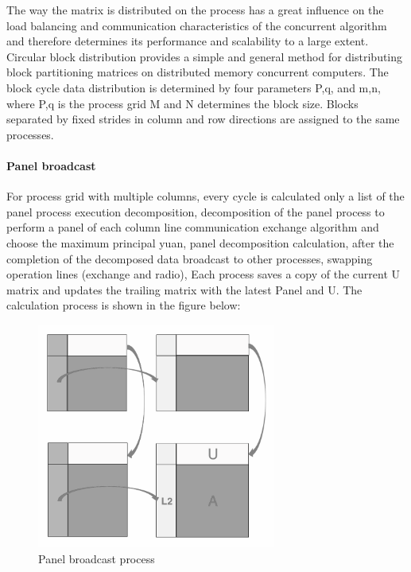 \documentclass[a4paper,12pt]{article}
\begin{document}
The way the matrix is distributed on the process has a great influence on the load balancing and communication characteristics of the concurrent algorithm and therefore determines its performance and scalability to a large extent. Circular block distribution provides a simple and general method for distributing block partitioning matrices on distributed memory concurrent computers. The block cycle data distribution is determined by four parameters P,q, and m,n, where P,q is the process grid M and N determines the block size. Blocks separated by fixed strides in column and row directions are assigned to the same processes.

\paragraph{Panel broadcast}

For process grid with multiple columns, every cycle is calculated only a list of the panel process execution decomposition, decomposition of the panel process to perform a panel of each column line communication exchange algorithm and choose the maximum principal yuan, panel decomposition calculation, after the completion of the decomposed data broadcast to other processes, swapping operation lines (exchange and radio), Each process saves a copy of the current U matrix and updates the trailing matrix with the latest Panel and U. The calculation process is shown in the figure below:

\begin{figure}[H]
    \centering
    \includegraphics[width=0.7\textwidth]{images/algorithm/Panel_broadcast_process.png}
    \caption{Panel broadcast process}
    \label{fig:panel_broadcast}
\end{figure}
\end{document}
